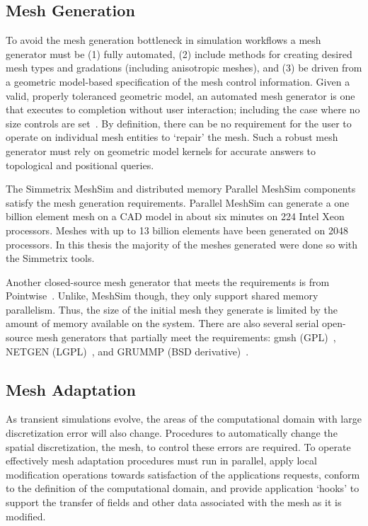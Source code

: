 \subsection{Mesh Generation}

To avoid the mesh generation bottleneck in simulation workflows a mesh generator
must be (1) fully automated, (2) include methods for creating desired mesh types
and gradations (including anisotropic meshes), and (3) be driven from a geometric
model-based specification of the mesh control information.
Given a valid, properly toleranced geometric model, an automated mesh generator
is one that executes to completion without user interaction; including the case
where no size controls are set~\cite{autoMeshGen1992}.
By definition, there can be no requirement for the user to operate on individual
mesh entities to `repair' the mesh.
Such a robust mesh generator must rely on geometric model kernels for accurate
answers to topological and positional queries.

The Simmetrix MeshSim and distributed memory Parallel MeshSim
components satisfy the mesh generation requirements.
Parallel MeshSim can generate a one billion element mesh on a CAD model
in about six minutes on 224 Intel Xeon processors.
Meshes with up to 13 billion elements have been generated on 2048 processors.
In this thesis the majority of the meshes generated were done so with the
Simmetrix tools.

Another closed-source mesh generator that meets the requirements is from
Pointwise~\cite{pointwise_web,pointwise_aiaa_2007}.
Unlike, MeshSim though, they only support shared memory parallelism.
Thus, the size of the initial mesh they generate is limited by the amount of
memory available on the system.
There are also several serial open-source mesh generators that partially meet the
requirements:
gmsh (GPL)~\cite{geuzaine2009gmsh},
NETGEN (LGPL)~\cite{netgen_Schoberl1997},
and GRUMMP (BSD derivative)~\cite{grummp2011,freitag1997tetrahedral}.

\subsection{Mesh Adaptation}

As transient simulations evolve, the areas of the computational domain with large
discretization error will also change.
Procedures to automatically change the spatial discretization, the mesh, to
control these errors are required.
To operate effectively mesh adaptation procedures must run in parallel, apply
local modification operations towards satisfaction of the applications requests,
conform to the definition of the computational domain, and provide application
`hooks' to support the transfer of fields and other data associated with the
mesh as it is modified.

